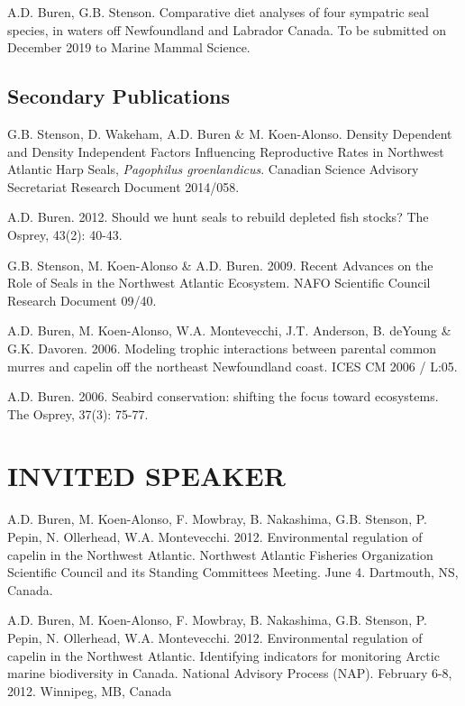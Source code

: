 \documentclass{res}
\begin{document}
\begin{resume}
\begin{hangparas}{.4in}{1}
A.D. Buren, G.B. Stenson. Comparative diet analyses of four sympatric seal species, in waters off Newfoundland and Labrador Canada. To be submitted on December 2019 to Marine Mammal Science.


 
\end{hangparas}

\subsection{Secondary Publications}
\begin{hangparas}{.4in}{1}
	
G.B. Stenson, D. Wakeham, A.D. Buren \& M. Koen-Alonso. Density Dependent and Density Independent Factors Influencing Reproductive Rates in Northwest Atlantic Harp Seals, \textit{Pagophilus groenlandicus}. Canadian Science Advisory Secretariat Research Document 	2014/058.

A.D. Buren. 2012. Should we hunt seals to rebuild depleted fish stocks? The Osprey, 43(2): 40-43.

G.B. Stenson, M. Koen-Alonso \& A.D. Buren. 2009. Recent Advances on the Role of Seals in the Northwest Atlantic Ecosystem. NAFO Scientific Council Research Document 09/40.

A.D. Buren, M. Koen-Alonso, W.A. Montevecchi, J.T. Anderson, B. deYoung \& G.K. Davoren. 2006. Modeling trophic interactions between parental common murres and capelin off the northeast Newfoundland coast. ICES CM 2006 / L:05.

A.D. Buren. 2006. Seabird conservation: shifting the focus toward ecosystems. The Osprey, 37(3): 75-77.

\end{hangparas}

\section{INVITED SPEAKER}
\vspace{0.1in} 
\begin{hangparas}{.4in}{1}
	A.D. Buren, M. Koen-Alonso, F. Mowbray, B. Nakashima, G.B. Stenson, P. Pepin, N. Ollerhead, W.A. Montevecchi. 2012. Environmental regulation of capelin in the Northwest Atlantic. Northwest Atlantic Fisheries Organization Scientific Council and its Standing Committees Meeting. June 4. Dartmouth, NS, Canada.
	
	A.D. Buren, M. Koen-Alonso, F. Mowbray, B. Nakashima, G.B. Stenson, P. Pepin, N. Ollerhead, W.A. Montevecchi. 2012. Environmental regulation of capelin in the Northwest Atlantic. Identifying indicators for monitoring Arctic marine biodiversity in Canada. National Advisory Process (NAP). February 6-8, 2012. Winnipeg, MB, Canada
\end{hangparas}	


\end{resume}
\end{document}
